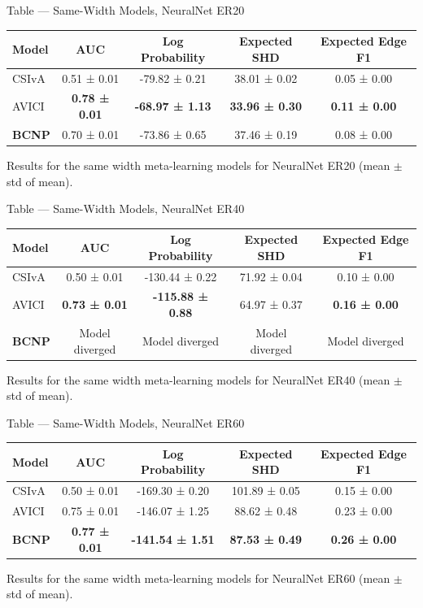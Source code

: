 \documentclass[aspectratio=169,10pt]{beamer}
\begin{document}
\begin{frame}{Table --- Same-Width Models, NeuralNet ER20}
\centering
\begin{tabular}{lcccc}
\toprule
\textbf{Model} & \textbf{AUC} & \textbf{ Log Probability} & \textbf{Expected SHD} & \textbf{Expected Edge F1} \\
\midrule
CSIvA & 0.51 ± 0.01 & -79.82 ± 0.21 & 38.01 ± 0.02 & 0.05 ± 0.00 \\
AVICI & \textbf{0.78 ± 0.01} & \textbf{-68.97 ± 1.13} & \textbf{33.96 ± 0.30} & \textbf{0.11 ± 0.00} \\
\textbf{BCNP} & 0.70 ± 0.01 & -73.86 ± 0.65 & 37.46 ± 0.19 & 0.08 ± 0.00 \\
\bottomrule
\end{tabular}

\vspace{0.3cm}
{\footnotesize Results for the same width meta-learning models for NeuralNet ER20 (mean $\pm$ std of mean).}
\end{frame}

\begin{frame}{Table --- Same-Width Models, NeuralNet ER40}
\centering
\begin{tabular}{lcccc}
\toprule
\textbf{Model} & \textbf{AUC} & \textbf{ Log Probability} & \textbf{Expected SHD} & \textbf{Expected Edge F1} \\
\midrule
CSIvA & 0.50 ± 0.01 & -130.44 ± 0.22 & 71.92 ± 0.04 & 0.10 ± 0.00 \\
AVICI & \textbf{0.73 ± 0.01} & \textbf{-115.88 ± 0.88} & 64.97 ± 0.37 & \textbf{0.16 ± 0.00} \\
\textbf{BCNP} & Model diverged & Model diverged & Model diverged & Model diverged \\
\bottomrule
\end{tabular}

\vspace{0.3cm}
{\footnotesize Results for the same width meta-learning models for NeuralNet ER40 (mean $\pm$ std of mean).}
\end{frame}

\begin{frame}{Table --- Same-Width Models, NeuralNet ER60}
\centering
\begin{tabular}{lcccc}
\toprule
\textbf{Model} & \textbf{AUC} & \textbf{Log Probability} & \textbf{Expected SHD} & \textbf{Expected Edge F1} \\
\midrule
CSIvA & 0.50 ± 0.01 & -169.30 ± 0.20 & 101.89 ± 0.05 & 0.15 ± 0.00 \\
AVICI & 0.75 ± 0.01 & -146.07 ± 1.25 & 88.62 ± 0.48 & 0.23 ± 0.00 \\
\textbf{BCNP} & \textbf{0.77 ± 0.01} & \textbf{-141.54 ± 1.51} & \textbf{87.53 ± 0.49} & \textbf{0.26 ± 0.00} \\
\bottomrule
\end{tabular}

\vspace{0.3cm}
{\footnotesize Results for the same width meta-learning models for NeuralNet ER60 (mean $\pm$ std of mean).}
\end{frame}
\end{document}
